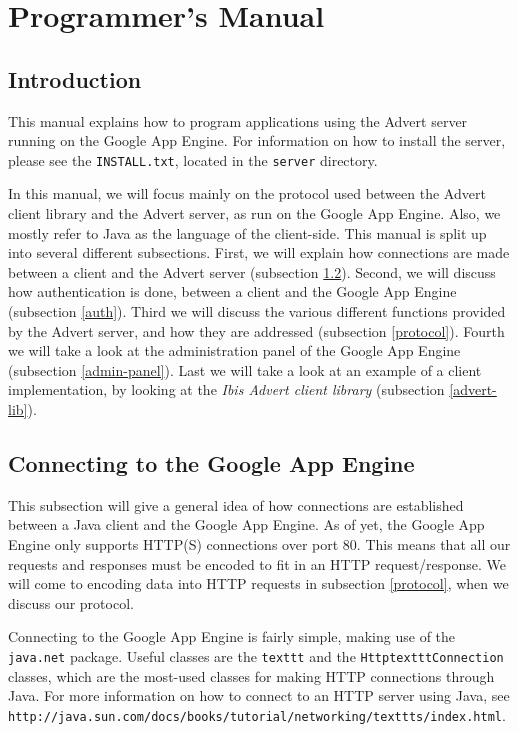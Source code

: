 \section{Programmer's Manual}
\subsection{Introduction}
\label{introduction}
This manual explains how to program applications using the Advert server running
on the Google App Engine. For information on how to install the server, please
see the \texttt{INSTALL.txt}, located in the \texttt{server} directory.

In this manual, we will focus mainly on the protocol used between the Advert
client library and the Advert server, as run on the Google App Engine. Also, we
mostly refer to Java as the language of the client-side. This manual is split up into
several different subsections. First, we will explain how connections are made
between a client and the Advert server (subsection \ref{http-java}). Second, we
will
discuss how authentication is done, between a client and the Google App Engine
(subsection \ref{auth}). Third we will discuss the various different functions
provided by the Advert server, and how they are addressed (subsection
\ref{protocol}). Fourth we will take a look at the administration panel of the
Google App Engine (subsection \ref{admin-panel}). Last we will take a look at an
example of a client implementation, by looking at the \emph{Ibis Advert
client library} (subsection \ref{advert-lib}).

\subsection{Connecting to the Google App Engine}
\label{http-java}
This subsection will give a general idea of how connections are established
between a Java client and the Google App Engine. As of yet, the Google App
Engine only supports HTTP(S) connections over port 80. This means that all our
requests and responses must be encoded to fit in an HTTP request/response. We
will come to encoding data into HTTP requests in subsection \ref{protocol}, when
we discuss our protocol.

Connecting to the Google App Engine is fairly simple, making use of the
\texttt{java.net} package. Useful classes are the \texttt{texttt} and the
\texttt{HttptextttConnection} classes, which are the most-used classes for making
HTTP connections through Java. For more information on how to connect to an
HTTP server using Java, see
\texttt{http://java.sun.com/docs/books/tutorial/networking/texttts/index.html}.

